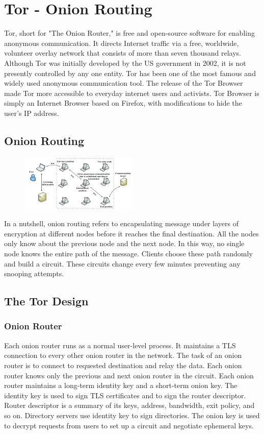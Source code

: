 \documentclass{main}
\begin{document}
\section{Tor - Onion Routing}

Tor, short for "The Onion Router," is free and open-source software for enabling anonymous communication. It directs Internet traffic via a free, worldwide, volunteer overlay network that consists of more than seven thousand relays.
Although Tor was initially developed by the US government in 2002, it is not presently controlled by any one entity.
Tor has been one of the most famous and widely used anonymous communication tool.
The release of the Tor Browser made Tor more accessible to everyday internet users and activists.  
Tor Browser is simply an Internet Browser based on Firefox, with modifications to hide the user's IP address. 

\subsection{Onion Routing}

\begin{figure}
    \centering
    \includegraphics[width=0.5\textwidth]{Resources/images/onion-routing.png}
\end{figure}

In a nutshell, onion routing refers to encapsulating message under layers of encryption at different nodes before it reaches the final destination. 
All the nodes only know about the previous node and the next node. 
In this way, no single node knows the entire path of the message. 
Clients choose these path randomly and build a circuit. 
These circuits change every few minutes preventing any snooping attempts. 

\subsection{The Tor Design}

\subsubsection{Onion Router}
Each onion router runs as a normal user-level process.
It maintains a TLS connection to every other onion router in the network.
The task of an onion router is to connect to requested destination and relay the data. 
Each onion router knows only the previous and next onion router in the circuit.
Each onion router maintains a long-term identity key and a short-term onion key.
The identity key is used to sign TLS certificates and to sign the router descriptor.
Router descriptor is a summary of its keys, address, bandwidth, exit policy, and so on.
Directory servers use identity key to sign directories. 
The onion key is used to decrypt requests from users to set up a circuit and negotiate ephemeral keys.
\end{document}
